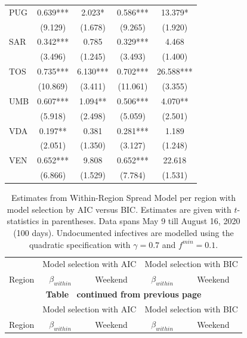 \documentclass[12pt]{article}
\begin{document}
\begin{appendices}
\begin{longtable}{@{}lcccc@{}}
            PUG & 0.639*** & 2.023* & 0.586*** & 13.379* \\ 
             & (9.129) & (1.678) & (9.265) & (1.920) \\ 
            SAR & 0.342*** & 0.785 & 0.329*** & 4.468 \\ 
             & (3.496) & (1.245) & (3.493) & (1.400) \\ 
            TOS & 0.735*** & 6.130*** & 0.702*** & 26.588*** \\ 
             & (10.869) & (3.411) & (11.061) & (3.355) \\  
            UMB & 0.607*** & 1.094** & 0.506*** & 4.070** \\ 
             & (5.918) & (2.498) & (5.059) & (2.501) \\ 
            VDA & 0.197** & 0.381 & 0.281*** & 1.189 \\ 
             & (2.051) & (1.350) & (3.127) & (1.248) \\ 
            VEN & 0.652*** & 9.808 & 0.652*** & 22.618 \\ 
             & (6.866) & (1.529) & (7.784) & (1.531) \\* \bottomrule
    	\end{longtable}
		
		\begin{longtable}{@{}lcccc@{}}
    		\caption{Estimates from Within-Region Spread Model per region with model selection by AIC versus BIC. Estimates are given with $t$-statistics in parentheses. Data spans May 9 till August 16, 2020 (100 days). Undocumented infectives are modelled using the quadratic specification with $\gamma = 0.7$ and $f^{min}=0.1$.}
    		\label{tab:model1_aic_vs_bic}\\
    		\toprule
    		                & \multicolumn{2}{c}{Model selection with AIC} & \multicolumn{2}{c}{Model selection with BIC} \\
    		                \cmidrule(lr){2-3}
                            \cmidrule(lr){4-5}
    		Region          & $\beta_{within}$ & Weekend & $\beta_{within}$ & Weekend \\* \midrule
    		\endfirsthead
    		
    		\multicolumn{5}{c}{{\bfseries Table \thetable\ continued from previous page}} \\
    		\toprule
    		                & \multicolumn{2}{c}{Model selection with AIC} & \multicolumn{2}{c}{Model selection with BIC} \\
    		                \cmidrule(lr){2-3}
                            \cmidrule(lr){4-5}
    		Region          & $\beta_{within}$ & Weekend & $\beta_{within}$ & Weekend \\* \midrule
    		\endhead
    		

\end{longtable}
\end{appendices}
\end{document}

